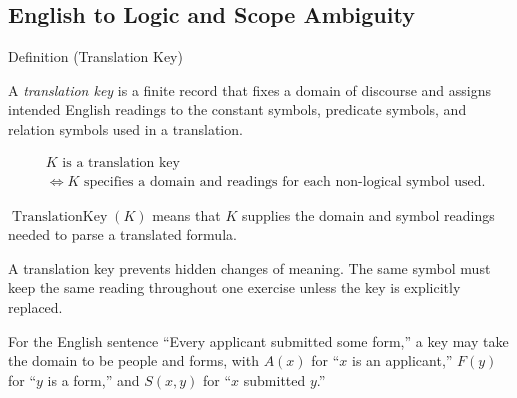 
\subsection*{English to Logic and Scope Ambiguity}

\begin{definitionbox}{Definition (Translation Key)}
\begin{definition}
\label{def:translation-key-predicate-logic}
A \emph{translation key} is a finite record that fixes a domain of discourse and
assigns intended English readings to the constant symbols, predicate symbols,
and relation symbols used in a translation.
\end{definition}
\end{definitionbox}

\begin{remark*}
\[
\begin{aligned}
&K \text{ is a translation key}\\
&\Longleftrightarrow
K \text{ specifies a domain and readings for each non-logical symbol used.}
\end{aligned}
\]
\end{remark*}

\begin{remark*}
\(\operatorname{TranslationKey}(K)\) means that \(K\) supplies the domain and
symbol readings needed to parse a translated formula.
\end{remark*}

\begin{remark*}[Interpretation]
A translation key prevents hidden changes of meaning. The same symbol must keep
the same reading throughout one exercise unless the key is explicitly replaced.
\end{remark*}

\begin{remark*}[Examples]
For the English sentence ``Every applicant submitted some form,'' a key may
take the domain to be people and forms, with \(A(x)\) for ``\(x\) is an
applicant,'' \(F(y)\) for ``\(y\) is a form,'' and \(S(x,y)\) for ``\(x\)
submitted \(y\).''
\end{remark*}


